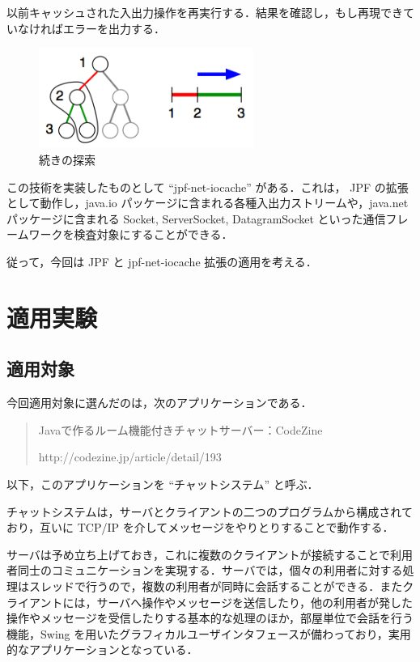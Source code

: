 \documentclass[a4j,12pt]{jarticle}
\begin{document}
以前キャッシュされた入出力操作を再実行する．結果を確認し，もし再現できていなければエラーを出力する．

\begin{figure}[here]
\centering
\includegraphics[width=7cm]{images/fig6c.png}
\caption{続きの探索 \cite{DBLP:conf/rv/Artho10}}
\label{figure:fig6c}
\end{figure}

\vspace{5mm}

この技術を実装したものとして ``jpf-net-iocache'' がある．これは， JPF の拡張として動作し，java.io パッケージに含まれる各種入出力ストリームや，java.net パッケージに含まれる Socket, ServerSocket, DatagramSocket といった通信フレームワークを検査対象にすることができる．

従って，今回は JPF と jpf-net-iocache 拡張の適用を考える．

\section{適用実験}

\subsection{適用対象}

今回適用対象に選んだのは，次のアプリケーションである．

\begin{quotation}
Javaで作るルーム機能付きチャットサーバー：CodeZine

http://codezine.jp/article/detail/193
\end{quotation}

以下，このアプリケーションを ``チャットシステム'' と呼ぶ．

チャットシステムは，サーバとクライアントの二つのプログラムから構成されており，互いに TCP/IP を介してメッセージをやりとりすることで動作する．

サーバは予め立ち上げておき，これに複数のクライアントが接続することで利用者同士のコミュニケーションを実現する．サーバでは，個々の利用者に対する処理はスレッドで行うので，複数の利用者が同時に会話することができる．またクライアントには，サーバへ操作やメッセージを送信したり，他の利用者が発した操作やメッセージを受信したりする基本的な処理のほか，部屋単位で会話を行う機能，Swing を用いたグラフィカルユーザインタフェースが備わっており，実用的なアプリケーションとなっている．
\newpage
\end{document}
